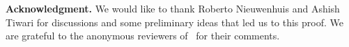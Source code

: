 \documentclass[smallextended]{svjour3}
\begin{document}
\vspace*{5pt}\noindent
{\bf Acknowledgment.} We would like to thank Roberto Nieuwenhuis and Ashish
Tiwari for discussions and some preliminary ideas that led us to this proof.
We are grateful to the anonymous reviewers of~\cite{Fellner1} for their comments.


%

\end{document}

